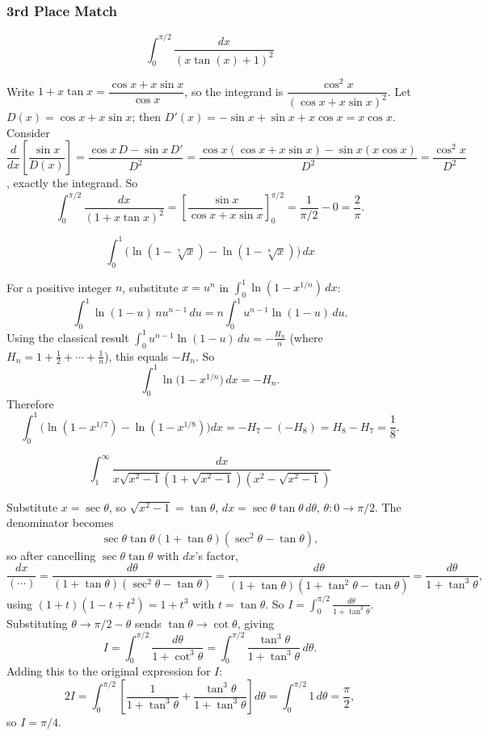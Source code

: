 \subsubsection*{3rd Place Match}
\begin{questions}

\question \[\int_0^{\pi/2} \frac{dx}{(x\tan(x)+1)^2}\]
\begin{solution}
Write $1+x\tan x=\dfrac{\cos x+x\sin x}{\cos x}$, so the integrand is $\dfrac{\cos^2 x}{(\cos x+x\sin x)^2}$.
Let $D(x)=\cos x+x\sin x$; then $D'(x)=-\sin x+\sin x+x\cos x=x\cos x$.
Consider $\dfrac{d}{dx}\left[\dfrac{\sin x}{D(x)}\right]=\dfrac{\cos x\, D-\sin x\, D'}{D^2}=\dfrac{\cos x(\cos x+x\sin x)-\sin x(x\cos x)}{D^2}=\dfrac{\cos^2x}{D^2}$,
exactly the integrand. So
\[
\int_0^{\pi/2}\frac{dx}{(1+x\tan x)^2}=\left[\frac{\sin x}{\cos x+x\sin x}\right]_0^{\pi/2}=\frac{1}{\pi/2}-0=\frac{2}{\pi}.
\]
\end{solution}

\question \[\int_0^1 \Big(\ln(1-\sqrt[7]{x})-\ln(1-\sqrt[8]{x})\Big)\,dx\]
\begin{solution}
For a positive integer $n$, substitute $x=u^n$ in $\displaystyle\int_0^1\ln(1-x^{1/n})\,dx$:
\[
\int_0^1\ln(1-u)\,nu^{n-1}\,du=n\int_0^1 u^{n-1}\ln(1-u)\,du.
\]
Using the classical result $\displaystyle\int_0^1 u^{n-1}\ln(1-u)\,du=-\frac{H_n}{n}$ (where $H_n=1+\tfrac12+\cdots+\tfrac1n$), this equals $-H_n$. So
\[
\int_0^1\ln\big(1-x^{1/n}\big)\,dx=-H_n.
\]
Therefore
\[
\int_0^1\Big(\ln(1-x^{1/7})-\ln(1-x^{1/8})\Big)dx=-H_7-(-H_8)=H_8-H_7=\frac18.
\]
\end{solution}

\question \[\int_1^\infty \frac{dx}{x\sqrt{x^2-1}\left(1+\sqrt{x^2-1}\right)\left(x^2-\sqrt{x^2-1}\right)}\]
\begin{solution}
Substitute $x=\sec\theta$, so $\sqrt{x^2-1}=\tan\theta$, $dx=\sec\theta\tan\theta\,d\theta$, $\theta:0\to\pi/2$. The denominator becomes
\[
\sec\theta\tan\theta(1+\tan\theta)(\sec^2\theta-\tan\theta),
\]
so after cancelling $\sec\theta\tan\theta$ with $dx$'s factor,
\[
\frac{dx}{(\cdots)}=\frac{d\theta}{(1+\tan\theta)(\sec^2\theta-\tan\theta)}=\frac{d\theta}{(1+\tan\theta)(1+\tan^2\theta-\tan\theta)}=\frac{d\theta}{1+\tan^3\theta},
\]
using $(1+t)(1-t+t^2)=1+t^3$ with $t=\tan\theta$.
So $I=\displaystyle\int_0^{\pi/2}\frac{d\theta}{1+\tan^3\theta}$. Substituting $\theta\to\pi/2-\theta$ sends $\tan\theta\to\cot\theta$, giving
\[
I=\int_0^{\pi/2}\frac{d\theta}{1+\cot^3\theta}=\int_0^{\pi/2}\frac{\tan^3\theta}{1+\tan^3\theta}\,d\theta.
\]
Adding this to the original expression for $I$:
\[
2I=\int_0^{\pi/2}\left[\frac{1}{1+\tan^3\theta}+\frac{\tan^3\theta}{1+\tan^3\theta}\right]d\theta=\int_0^{\pi/2}1\,d\theta=\frac\pi2,
\]
so $I=\pi/4$.
\end{solution}


\end{questions}
